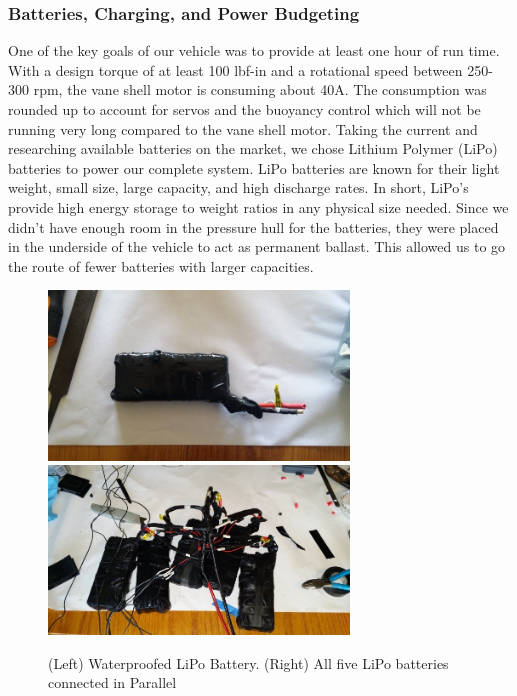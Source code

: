 \documentclass{report}
\begin{document}
\subsubsection{Batteries, Charging, and Power Budgeting}
One of the key goals of our vehicle was to provide at least one hour of run time.  With a design torque of at least 100 lbf-in and a rotational speed between 250-300 rpm, the vane shell motor is consuming about 40A.  The consumption was rounded up to account for servos and the buoyancy control which will not be running very long compared to the vane shell motor.  Taking the current and researching available batteries on the market, we chose Lithium Polymer (LiPo) batteries to power our complete system.  LiPo batteries are known for their light weight, small size, large capacity, and high discharge rates.  In short, LiPo’s provide high energy storage to weight ratios in any physical size needed.  Since we didn’t have enough room in the pressure hull for the batteries, they were placed in the underside of the vehicle to act as permanent ballast.  This allowed us to go the route of fewer batteries with larger capacities.\par
\begin{figure}[H]
\centering
\includegraphics[width=8cm]{"singleBattery"}
\includegraphics[width=8cm]{"batteries"}
\caption{(Left) Waterproofed LiPo Battery. (Right) All five LiPo batteries connected in Parallel}
\end{figure}
\end{document}
